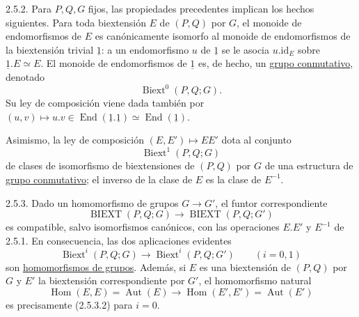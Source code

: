 
2.5.2. Para $P,Q,G$ fijos, las propiedades precedentes implican los
hechos siguientes. Para toda biextensión $E$ de $(P,Q)$ por $G$, el
monoide de endomorfismos de $E$ es canónicamente isomorfo al monoide de
endomorfismos de la biextensión trivial $\underline 1$: a un
endomorfismo $u$ de $\underline 1$ se le asocia
$u.\mathrm{id}_E$ sobre $\underline 1.E\simeq E$. El monoide de
endomorfismos de $\underline 1$ es, de hecho, un
\underline{grupo conmutativo}, denotado
\begin{equation}\tag{2.5.2.1}
 \operatorname{Biext}^{0}(P,Q;G).
\end{equation}
Su ley de composición viene dada también por
$(u,v)\mapsto u.v\in
\operatorname{End}(\underline 1.\underline 1)
\simeq\operatorname{End}(\underline 1)$.

Asimismo, la ley de composición $(E,E')\mapsto EE'$ dota al conjunto
\begin{equation}\tag{2.5.2.2}
 \operatorname{Biext}^{1}(P,Q;G)
\end{equation}
de clases de isomorfismo de biextensiones de $(P,Q)$ por $G$ de una
estructura de \underline{grupo conmutativo}; el inverso de la clase de
$E$ es la clase de $E^{-1}$.

2.5.3. Dado un homomorfismo de grupos $G\longrightarrow G'$, el funtor
correspondiente
\begin{equation}\tag{2.5.3.1}
 \operatorname{BIEXT}(P,Q;G)
 \longrightarrow
 \operatorname{BIEXT}(P,Q;G')
\end{equation}
es compatible, salvo isomorfismos canónicos, con las operaciones
$E.E'$ y $E^{-1}$ de 2.5.1. En consecuencia, las dos aplicaciones
evidentes
\begin{equation}\tag{2.5.3.2}
 \operatorname{Biext}^{i}(P,Q;G)
 \longrightarrow
 \operatorname{Biext}^{i}(P,Q;G')
 \qquad(i=0,1)
\end{equation}
son \underline{homomorfismos de grupos}. Además, si $E$ es una
biextensión de $(P,Q)$ por $G$ y $E'$ la biextensión correspondiente
por $G'$, el homomorfismo natural
\begin{equation}\tag{2.5.3.3}
 \operatorname{Hom}(E,E)=\operatorname{Aut}(E)
 \longrightarrow
 \operatorname{Hom}(E',E')=\operatorname{Aut}(E')
\end{equation}
es precisamente (2.5.3.2) para $i=0$.


